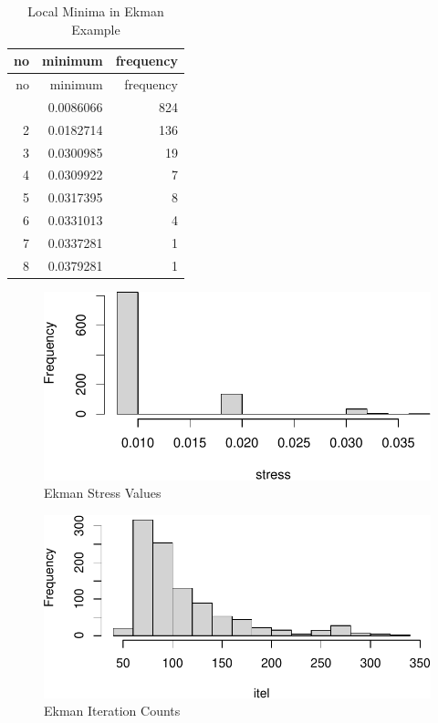\documentclass[
  12pt,
  letterpaper,
  DIV=11,
  numbers=noendperiod]{scrreprt}
\theoremstyle{remark}
\begin{document}
\begin{longtable}[]{@{}rrr@{}}
\caption{Local Minima in Ekman Example}\tabularnewline
\toprule\noalign{}
no & minimum & frequency \\
\midrule\noalign{}
\endfirsthead
\toprule\noalign{}
no & minimum & frequency \\
\midrule\noalign{}
\endhead
\bottomrule\noalign{}
\endlastfoot
1 & 0.0086066 & 824 \\
2 & 0.0182714 & 136 \\
3 & 0.0300985 & 19 \\
4 & 0.0309922 & 7 \\
5 & 0.0317395 & 8 \\
6 & 0.0331013 & 4 \\
7 & 0.0337281 & 1 \\
8 & 0.0379281 & 1 \\
\end{longtable}

\begin{figure}[H]

{\centering \includegraphics{global_files/figure-pdf/ekmanhistplot1-1.pdf}

}

\caption{Ekman Stress Values}

\end{figure}%

\begin{figure}[H]

{\centering \includegraphics{global_files/figure-pdf/ekmanhistplot2-1.pdf}

}

\caption{Ekman Iteration Counts}

\end{figure}%
\end{document}

